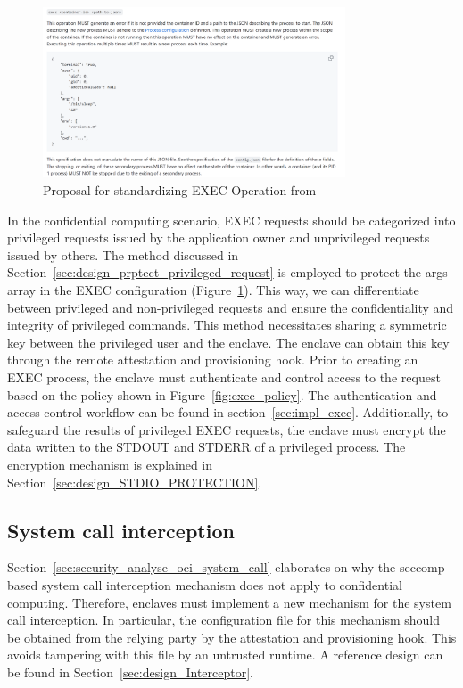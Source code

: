 \begin{figure}[!htb]
    \centering
    \includegraphics[width=0.8\textwidth]{images/exec_propose.png}
    \caption[Proposal for standardizing EXEC operation]{Proposal for standardizing EXEC Operation from~\cite*{exec_proposal}}
    \label{fig:exec_propose}
\end{figure}
 
In the confidential computing scenario, EXEC requests should be categorized into privileged requests issued by the application owner and unprivileged requests issued by others. The method discussed in Section~\ref{sec:design_prptect_privileged_request} is employed to protect the args array in the EXEC configuration (Figure~\ref{fig:exec_propose}). This way, 
we can differentiate between privileged and non-privileged requests and ensure the confidentiality and integrity of privileged commands. This method necessitates sharing a symmetric key between the privileged user and the enclave. The enclave can obtain this key through the remote attestation and provisioning hook. Prior to creating an EXEC process,
the enclave must authenticate and control access to the request based on the policy shown in Figure~\ref{fig:exec_policy}. The authentication and access control workflow can be found in section~\ref{sec:impl_exec}. Additionally, to safeguard the results of privileged EXEC requests, the enclave must encrypt the data written to the STDOUT and STDERR of a 
privileged process. The encryption mechanism is explained in Section~\ref{sec:design_STDIO_PROTECTION}.


\subsection{System call interception}
Section~\ref{sec:security_analyse_oci_system_call} elaborates on why the seccomp-based system call interception mechanism does not apply to confidential computing. Therefore, enclaves must implement a new mechanism for the system call interception. In particular, the configuration file for this mechanism should be obtained from the relying party by the attestation and provisioning hook. 
This avoids tampering with this file by an untrusted runtime. A reference design can be found in Section~\ref{sec:design_Interceptor}.


